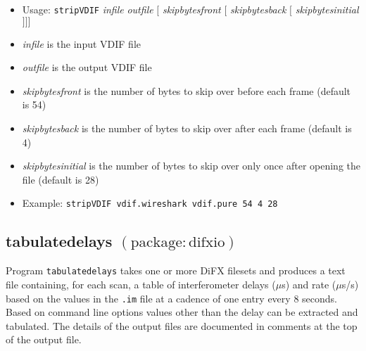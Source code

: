 \begin{itemize}
\item[] Usage: {\tt stripVDIF} {\em infile} {\em outfile} $[$ {\em skipbytesfront} $[$ {\em skipbytesback} $[$ {\em skipbytesinitial} $] ] ]$

\item[] {\em infile} is the input VDIF file
\item[] {\em outfile} is the output VDIF file
\item[] {\em skipbytesfront} is the number of bytes to skip over before each frame (default is 54)
\item[] {\em skipbytesback} is the number of bytes to skip over after each frame (default is 4)
\item[] {\em skipbytesinitial} is the number of bytes to skip over only once after opening the file (default is 28)

\item[] Example: {\tt stripVDIF vdif.wireshark vdif.pure 54 4 28}
\end{itemize}







\subsection{tabulatedelays {\small $\mathrm{(package: difxio)}$}} \label{sec:tabulatedelays}

Program {\tt tabulatedelays} takes one or more DiFX filesets and produces a text file containing, for each scan, a table of interferometer delays ($\mu$s) and rate ($\mu$s/s) based on the values in the {\tt .im} file at a cadence of one entry every 8 seconds.
Based on command line options values other than the delay can be extracted and tabulated.
The details of the output files are documented in comments at the top of the output file.

